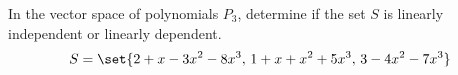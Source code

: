 In the vector space of polynomials $P_3$, determine if the set $S$ is linearly independent or linearly dependent.
%
\begin{equation*}
S=\set{2 +x -3x^2 -8x^3,\, 1+ x + x^2 +5x^3,\, 3 -4x^2 -7x^3}
\end{equation*}